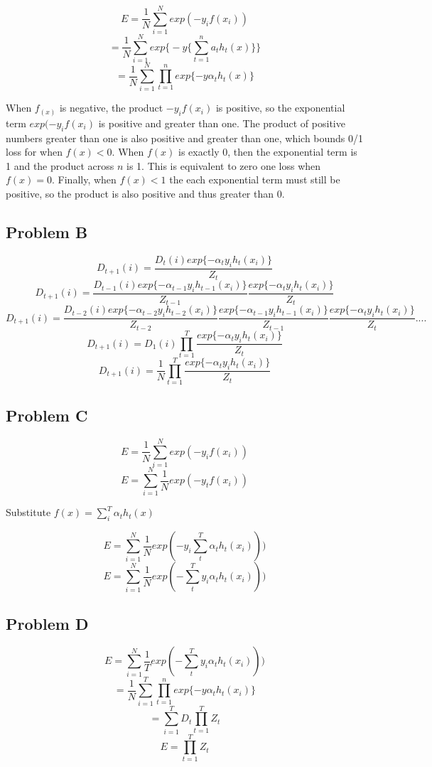 \documentclass[12pt]{article} %
\begin{document}
$$E = \frac{1}{N}\sum_{i=1}^{N}exp(-y_i f(x_i))$$
$$ = \frac{1}{N}\sum_{i=1}^{N}exp\Big\{-y\{\sum_{t=1}^{n}a_th_t(x)\}\Big\}$$
$$ = \frac{1}{N}\sum_{i=1}^{N}\prod_{t=1}^n exp\{-y\alpha_th_t(x)\}$$

When $f_(x)$ is negative, the product $-y_i f(x_i)$ is positive, so the exponential term $exp(-y_if(x_i)$ is positive and greater than one. The product of positive numbers greater than one is also positive and greater than one, which bounds 0/1 loss for when $f(x) < 0$. When $f(x)$ is exactly 0, then the exponential term is 1 and the product across $n$ is 1. This is equivalent to zero one loss when $f(x) = 0$. Finally, when $f(x) < 1$ the each exponential term must still be positive, so the product is also positive and thus greater than 0.


\subsection{Problem B}

$$D_{t+1}(i) = \frac{D_t(i)exp\{-\alpha_ty_ih_t(x_i)\}}{Z_t}$$
$$D_{t+1}(i) = \frac{D_{t-1}(i)exp\{-\alpha_{t-1}y_ih_{t-1}(x_i)\}}{Z_{t-1}}\frac{exp\{-\alpha_ty_ih_t(x_i)\}}{Z_t}$$
$$D_{t+1}(i) = \frac{D_{t-2}(i)exp\{-\alpha_{t-2}y_ih_{t-2}(x_i)\}}{Z_{t-2}}\frac{exp\{-\alpha_{t-1}y_ih_{t-1}(x_i)\}}{Z_{t-1}}\frac{exp\{-\alpha_ty_ih_t(x_i)\}}{Z_t}....$$
$$D_{t+1}(i) = D_1(i)\prod_{t=1}^{T}\frac{exp\{-\alpha_ty_ih_t(x_i)\}}{Z_t}$$
$$D_{t+1}(i) = \frac{1}{N}\prod_{t=1}^{T}\frac{exp\{-\alpha_ty_ih_t(x_i)\}}{Z_t}$$





\subsection{Problem C}
$$E = \frac{1}{N}\sum_{i=1}^{N}exp(-y_i f(x_i))$$
$$E = \sum_{i=1}^{N}\frac{1}{N}exp(-y_t f(x_i))$$

Substitute $f(x) = \sum_i^T\alpha_th_t(x)$

$$E = \sum_{i=1}^{N}\frac{1}{N}exp(-y_i  \sum_t^T\alpha_th_t(x_i)))$$
$$E = \sum_{i=1}^{N}\frac{1}{N}exp(-  \sum_t^Ty_i\alpha_th_t(x_i)))$$

\subsection{Problem D}
$$E = \sum_{i=1}^{N}\frac{1}{T}exp(-  \sum_t^Ty_i\alpha_th_t(x_i)))$$
$$ = \frac{1}{N}\sum_{i=1}^{T}\prod_{t=1}^n exp\{-y\alpha_th_t(x_i)\}$$
$$ = \sum_{i=1}^{T}D_t\prod_{t=1}^{T}Z_t$$
$$ E = \prod_{t=1}^{T}Z_t$$
\end{document}
